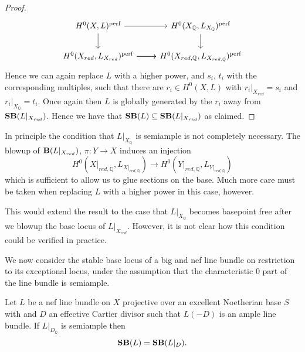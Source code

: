 \begin{proof}
	\[
	\begin{tikzcd}
	{H^{0}(X,L)^{\perf}} \arrow[d] \arrow[r]                 & {H^{0}(X_{\mathbb{Q}},L_{X_{\mathbb{Q}}})^{\perf}} \arrow[d] \\
	{H^{0}(X_{red},L_{X_{red}})^{\perf}} \arrow[r] \arrow[r] & {H^{0}(X_{red,\mathbb{Q}},L_{X_{red,\mathbb{Q}}})^{\perf}}  
	\end{tikzcd}	
	\]
	Hence we can again replace $L$ with a higher power, and $s_{i}$, $t_{i}$ with the corresponding multiples, such that there are $r_{i} \in H^{0}(X,L)$ with $r_{i}|_{X_{red}}=s_{i}$ and $r_{i}|_{X_{\mathbb{Q}}}=t_{i}$. Once again then $L$ is globally generated by the $r_{i}$ away from $\mathbf{SB}(L|_{X_{red}})$. Hence we have that $\mathbf{SB}(L)\subseteq \mathbf{SB}(L|_{X_{red}})$ as claimed.
\end{proof}

\begin{remark}
	
	In principle the condition that $L|_{X_{\mathbb{Q}}}$ is semiample is not completely necessary. The blowup of $\mathbf{B}(L|_{X_{red}})$, $\pi: Y \to X$ induces an injection $$H^{0}(X|_{red,\mathbb{Q}},L_{X|_{red,\mathbb{Q}}}) \to H^{0}(Y|_{red,\mathbb{Q}},L_{Y|_{red,\mathbb{Q}}})$$ which is sufficient to allow us to glue sections on the base. Much more care must be taken when replacing $L$ with a higher power in this case, however. 
		
	This would extend the result to the case that $L|_{X_{\mathbb{Q}}}$ becomes basepoint free after we blowup the base locus of $L|_{X_{red}}$. However, it is not clear how this condition could be verified in practice.
	
\end{remark}

We now consider the stable base locus of a big and nef line bundle on restriction to its exceptional locus, under the assumption that the characteristic $0$ part of the line bundle is semiample.

\begin{lemma}
	Let $L$ be a nef line bundle on $X$ projective over an excellent Noetherian base $S$ with and $D$ an effective Cartier divisor such that $L(-D)$ is an ample line bundle. If $L|_{D_{\mathbb{Q}}}$ is semiample then \[\mathbf{SB}(L)=\mathbf{SB}(L|_{D}).\]
\end{lemma}	

